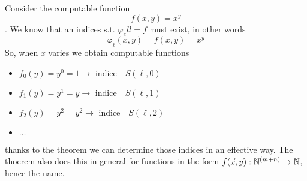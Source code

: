 \begin{example}
  Consider the computable function \[f(x,y) = x^y\]. We know that an
  indices s.t. \(\varphi_ell = f\) must exist, in other
  words \[\varphi_\ell(x,y) = f(x,y) = x^y\] So, when $x$ varies we
  obtain computable functions
  \begin{itemize}
  \item[] \(f_0(y) = y^0 = 1 \rightarrow \mbox{ indice} \quad S(\ell,0)\)
  \item[] \(f_1(y) = y^1 = y \rightarrow \mbox{ indice} \quad S(\ell,1)\)
  \item[] \(f_2(y) = y^2 = y^2 \rightarrow \mbox{ indice} \quad S(\ell,2)\)
  \item[] \(\dots\)
  \end{itemize}
  thanks to the \smn theorem we can determine those indices in an
  effective way. The thoerem also does this in general for functions
  in the form $f(\vec{x}, \vec{y}) : \mathbb{N}^{(m+n)} \rightarrow \mathbb{N}$,
  hence the name.
\end{example}

